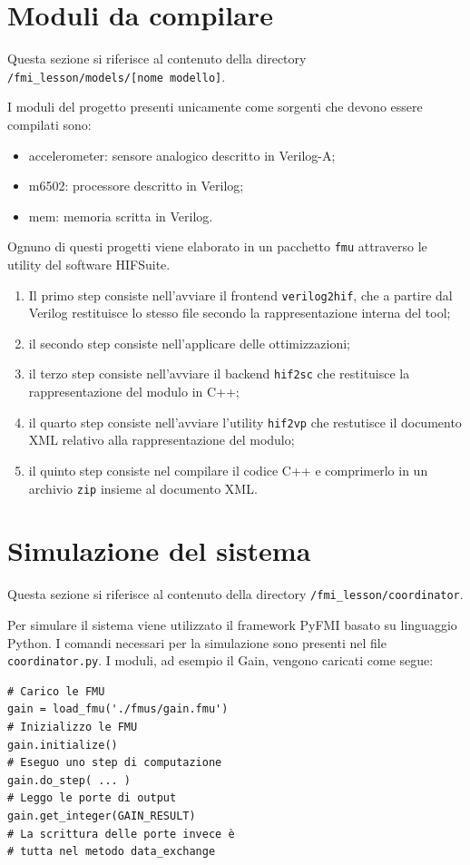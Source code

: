 \documentclass[]{IEEEtran}
\newcommand{\url}[1]{\texttt{#1}}
\newcommand{\code}[1]{\texttt{#1}}
\newcommand{\module}[1]{\textsf{\small #1}}
\begin{document}
\section{Moduli da compilare}

Questa sezione si riferisce al contenuto della directory \url{/fmi_lesson/models/[nome modello]}.

I moduli del progetto presenti unicamente come sorgenti che devono essere compilati sono:
\begin{itemize}
    \item \module{accelerometer}: sensore analogico descritto in Verilog-A;
    \item \module{m6502}: processore descritto in Verilog;
    \item \module{mem}: memoria scritta in Verilog.
\end{itemize}
Ognuno di questi progetti viene elaborato in un pacchetto \code{fmu} attraverso le utility del software HIFSuite.
\begin{enumerate}
    \item Il primo step consiste nell'avviare il frontend \code{verilog2hif}, che a partire dal Verilog restituisce lo stesso file secondo la rappresentazione interna del tool;
    \item il secondo step consiste nell'applicare delle ottimizzazioni;
    \item il terzo step consiste nell'avviare il backend \code{hif2sc} che restituisce la rappresentazione del modulo in C++;
    \item il quarto step consiste nell'avviare l'utility \code{hif2vp} che restutisce il documento XML relativo alla rappresentazione del modulo;
    \item il quinto step consiste nel compilare il codice C++ e comprimerlo in un archivio \code{zip} insieme al documento XML.
\end{enumerate}

\section{Simulazione del sistema}

Questa sezione si riferisce al contenuto della directory \url{/fmi_lesson/coordinator}.

Per simulare il sistema viene utilizzato il framework PyFMI basato su linguaggio Python. I comandi necessari per la simulazione sono presenti nel file \url{coordinator.py}. I moduli, ad esempio il \module{Gain}, vengono caricati come segue:
\begin{verbatim}
# Carico le FMU
gain = load_fmu('./fmus/gain.fmu')
# Inizializzo le FMU
gain.initialize()
# Eseguo uno step di computazione
gain.do_step( ... )
# Leggo le porte di output
gain.get_integer(GAIN_RESULT)
# La scrittura delle porte invece è
# tutta nel metodo data_exchange
\end{verbatim}
\end{document}
